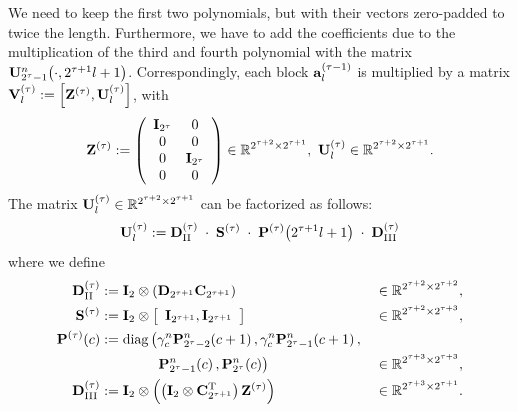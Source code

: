 We need to keep the first two polynomials, but with their vectors zero-padded to twice the length. Furthermore, we have to add the coefficients due to the multiplication of the third and fourth polynomial with the matrix $\mathbf{U}_{2^{\tau}-1}^{n}{\hspace{-0.4ex}}\left(\cdot,2^{\tau+1}l+1\right)$.
Correspondingly, each block $\mathbf{a}_{l}^{(\tau-1)}$ is multiplied by a matrix $\mathbf{V}^{(\tau)}_l := \left[\mathbf{Z^{(\tau)}},\mathbf{U}^{(\tau)}_l\right]$, with
$$\V{Z}^{(\tau)} := \left(\begin{array}{cccc} \V{I}_{2^{\tau}} & 0\\ 0 & 0 \\ 0 & \V{I}_{2^{\tau}} \\ 0 & 0 \end{array}\right) \in \R^{2^{\tau+2} \times 2^{\tau+1}},\ \V{U}^{(\tau)}_l \in \R^{2^{\tau+2} \times 2^{\tau+1}}.$$
The matrix $\mathbf{U}^{(\tau)}_l \in \mathbb{R}^{2^{\tau+2} \times 2^{\tau+1}}$ can be factorized as follows:
\begin{equation} 
  \label{NFSFT:LinearAlgebra:Factorization}
  \mathbf{U}^{(\tau)}_l := \mathbf{D}^{(\tau)}_{\text{II}} \; \cdot \; \mathbf{S}^{(\tau)} \; \cdot \; \mathbf{P}^{(\tau)}{\hspace{-0.4ex}}\left(2^{\tau + 1}l+1\right) \; \cdot \; \mathbf{D}^{(\tau)}_{\text{III}}
\end{equation}
where we define
\begin{align*}
  \mathbf{D}^{(\tau)}_{\text{II}} & := \mathbf{I}_{2} \otimes \left(\mathbf{D}_{2^{\tau+1}} \mathbf{C}_{2^{\tau+1}}\right) & \in \mathbb{R}^{2^{\tau+2} \times 2^{\tau+2}},\\
  \mathbf{S}^{(\tau)} & := \mathbf{I}_2 \otimes \left[\begin{array}{cc}\mathbf{I}_{2^{\tau+1}},\mathbf{I}_{2^{\tau+1}}\end{array}\right] & \in \mathbb{R}^{2^{\tau+2} \times 2^{\tau+3}},\\
  \mathbf{P}^{(\tau)}{\hspace{-0.4ex}}\left(c\right) & := \text{diag}\left(\gamma_{c}^n \mathbf{P}_{2^{\tau}-2}^n{\hspace{-0.4ex}}\left(c+1\right),\gamma_{c}^n \mathbf{P}_{2^{\tau}-1}^n{\hspace{-0.4ex}}\left(c+1\right),\right.\\
    & \left. \hspace{9ex} \mathbf{P}_{2^{\tau}-1}^n{\hspace{-0.4ex}}\left(c\right), \mathbf{P}_{2^{\tau}}^n{\hspace{-0.4ex}}\left(c\right)\right) & \in \mathbb{R}^{2^{\tau+3} \times 2^{\tau+3}},\\
  \mathbf{D}^{(\tau)}_{\text{III}} & := \mathbf{I}_{2} \otimes \left(\left(\mathbf{I}_{2} \otimes \mathbf{C}^{\text{\rm{T}}}_{2^{\tau+1}}\right)\mathbf{Z}^{(\tau)}\right) & \in \mathbb{R}^{2^{\tau+3} \times 2^{\tau+1}}.
\end{align*}   
